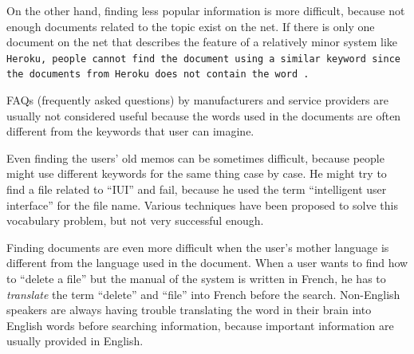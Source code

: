 \documentclass[manuscript,anonymous,review]{acmart}
\begin{document}


On the other hand,
finding less popular information is more difficult,
because not enough documents related to the topic exist on the net.
%
If there is only one document on the net
that describes the  feature of a relatively minor system like \tt{Heroku},
people cannot find the document using a similar keyword 
since the documents from \tt{Heroku} does not contain the word .



FAQs (frequently asked questions) by manufacturers and service providers are
usually not considered useful
because the words used in the documents are
often different from the keywords that user can imagine.


Even finding the users' old memos can be sometimes difficult,
because people might use different keywords for the same thing case by case.
He might try to find a file related to ``IUI'' and fail, because he used
the term ``intelligent user interface'' for the file name.
%
Various techniques have been proposed to solve this vocabulary problem\cite{Furnas:1987:VPH:32206.32212},
but not very successful enough.


Finding documents are even more difficult when
the user's mother language is different from the language used in the document.
When a user wants to find how to ``delete a file'' but the
manual of the system is written in French,
he has to \textit{translate} the term ``delete'' and ``file'' into French
before the search.
Non-English speakers are always having trouble
translating the word in their brain into English words
before searching information, because important information are
usually provided in English.
\end{document}
